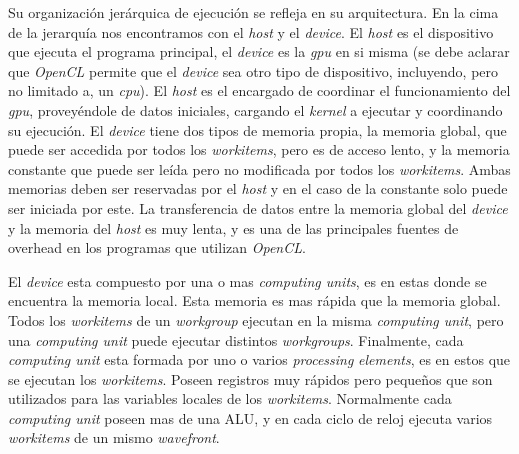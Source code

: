 Su organización jerárquica de ejecución se refleja en su arquitectura. En la
cima de la jerarquía nos encontramos con el \emph{host} y el \emph{device}. El
\emph{host} es el dispositivo que ejecuta el programa principal, el
\emph{device} es la \emph{gpu} en si misma (se debe aclarar que \emph{OpenCL} permite
que el \emph{device} sea otro tipo de dispositivo, incluyendo, pero no limitado
a, un \emph{cpu}). El \emph{host} es el encargado de coordinar el funcionamiento
del \emph{gpu}, proveyéndole de datos iniciales, cargando el \emph{kernel} a
ejecutar y coordinando su ejecución. El \emph{device} tiene dos tipos de memoria
propia, la memoria global, que puede ser accedida por todos los
\emph{workitems}, pero es de acceso lento, y la memoria constante que puede ser
leída pero no modificada por todos los \emph{workitems}. Ambas memorias deben
ser reservadas por el \emph{host} y en el caso de la constante solo puede ser
iniciada por este. La transferencia de datos entre la memoria global del
\emph{device} y la memoria del \emph{host} es muy lenta, y es una de las
principales fuentes de overhead en los programas que utilizan \emph{OpenCL}.

El \emph{device} esta compuesto por una o mas \emph{computing units}, es en
estas donde se encuentra la memoria local. Esta memoria es mas rápida que la
memoria global.  Todos los \emph{workitems} de un \emph{workgroup} ejecutan en
la misma \emph{computing unit}, pero una \emph{computing unit} puede ejecutar
distintos \emph{workgroups}. Finalmente, cada \emph{computing unit} esta formada
por uno o varios \emph{processing} \emph{elements}, es en estos que se ejecutan
los \emph{workitems}. Poseen registros muy rápidos pero pequeños que son
utilizados para las variables locales de los \emph{workitems}. Normalmente cada
\emph{computing unit} poseen mas de una ALU, y en cada ciclo de reloj ejecuta
varios \emph{workitems} de un mismo \emph{wavefront}.
